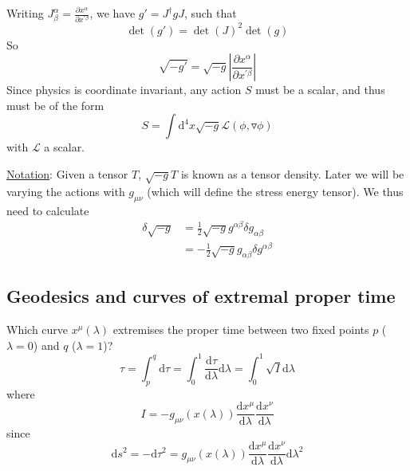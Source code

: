 \documentclass[a4paper]{book}
\theoremstyle{definition}
\theoremstyle{remark}
\begin{document}
Writing $J^\alpha_\beta = \frac{\partial x^\alpha}{\partial x^{'\beta}}$, we have $g' = J^\dagger g J$, such that 
\begin{equation}
    \det(g') = \det(J)^2 \det(g) 
\end{equation}
So 
\begin{equation}
    \sqrt{-g'} = \sqrt{-g}\left|\frac{\partial x^\alpha}{\partial x^{'\beta}}\right|
\end{equation}
Since physics is coordinate invariant, any action $S$ must be a scalar, and thus must be of the form 
\begin{equation}
    S = \int \text{d}^4 x \sqrt{-g}\mathcal{L}(\phi, \triangledown \phi)
\end{equation}
with $\mathcal{L}$ a scalar. \par \medskip 

\underline{Notation}: Given a tensor $T$, $\sqrt{-g}T$ is known as a tensor density. Later we will be varying the actions with $g_{\mu\nu}$ (which will define the stress energy tensor). We thus need to calculate 
\begin{equation}
    \begin{aligned}
        \delta \sqrt{-g} &= \frac{1}{2}\sqrt{-g}g^{\alpha\beta}\delta g_{\alpha \beta} \\
        &= -\frac{1}{2}\sqrt{-g}g_{\alpha\beta}\delta g^{\alpha \beta}
    \end{aligned}
\end{equation}

\subsection{Geodesics and curves of extremal proper time}

Which curve $x^\mu(\lambda)$ extremises the proper time between two fixed points $p$ ($\lambda = 0$) and $q$ ($\lambda = 1$)? 
\begin{equation}
    \tau = \int_{p}^{q} \text{d}\tau = \int_{0}^{1}\frac{\text{d}\tau}{\text{d}\lambda} \text{d}\lambda = \int_{0}^{1}\sqrt{I}\text{d}\lambda 
\end{equation}
where 
\begin{equation}
    I = -g_{\mu\nu}(x(\lambda)) \frac{\text{d}x^\mu}{\text{d}\lambda}\frac{\text{d}x^\nu}{\text{d}\lambda}
\end{equation}
since 
\begin{equation}
    \text{d}s^2 = -\text{d}\tau^2 = g_{\mu\nu}(x(\lambda)) \frac{\text{d}x^\mu}{\text{d}\lambda}\frac{\text{d}x^\nu}{\text{d}\lambda} \text{d}\lambda^2
\end{equation}
\end{document}
